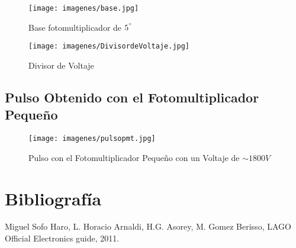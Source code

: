 \documentclass[spanish,notitlepage,letterpaper,12pt]{article} %
\begin{document}
  \begin{figure}[htp!]
     \centering
     \texttt{[image: imagenes/base.jpg]}
     \caption{Base fotomultiplicador de $5^{"}$} 
     \end{figure}  
  
   \begin{figure}[htp!]
     \centering
     \texttt{[image: imagenes/DivisordeVoltaje.jpg]}
     \caption{Divisor de Voltaje} 
     \end{figure} 
  
 \subsection{Pulso Obtenido con el Fotomultiplicador Pequeño}  
 \begin{figure}[htp!]
     \centering
     \texttt{[image: imagenes/pulsopmt.jpg]}
     \caption{Pulso con el Fotomultiplicador Pequeño con un Voltaje de $\sim 1800V$} 
     \end{figure}  
 
  
 \newpage
\section{Bibliograf\'ia}
 
 \begin{enumerate}
  

 Miguel Sofo Haro, L. Horacio Arnaldi, H.G. Asorey, M. Gomez Berisso, LAGO Official Electronics guide, 2011.

 \end{enumerate}
 
 
\end{document}
